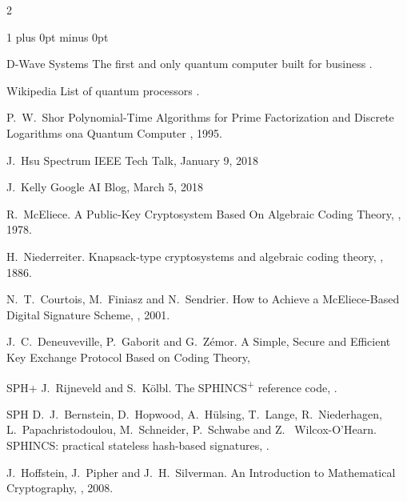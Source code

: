 \documentclass[a4paper,11pt]{article}
\begin{document}
\begin{otherlanguage}{english}
\begin{multicols}{2}
\begin{thebibliography}{1}
\itemsep=0cm plus 0pt minus 0pt

D-Wave Systems
\newblock The first and only quantum computer built for business
.

Wikipedia
\newblock List of quantum processors
.

P.~W.~Shor
\newblock Polynomial-Time Algorithms for Prime Factorization and Discrete Logarithms ona Quantum Computer
, 1995.

  J.~Hsu
  \newblock Spectrum IEEE Tech Talk, January 9, 2018

  J.~Kelly
  \newblock Google AI Blog, March 5, 2018

R.~McEliece.
\newblock A Public-Key Cryptosystem Based On Algebraic Coding Theory,
, 1978.

H.~Niederreiter.
\newblock Knapsack-type cryptosystems and algebraic coding theory,
, 1886.

N.~T.~Courtois, M.~Finiasz and N.~Sendrier.
\newblock How to Achieve a McEliece-Based Digital Signature Scheme,
, 2001.

J.~C.~Deneuveville, P.~Gaborit and G.~Zémor.
\newblock A Simple, Secure and Efficient Key Exchange Protocol Based on Coding Theory,

\bibitem
{SPH+}
J.~Rijneveld and S.~Kölbl.
\newblock The SPHINCS\textsuperscript{+} reference code,
.

\bibitem
{SPH}
D.~J.~Bernstein, D.~Hopwood, A.~Hülsing, T.~Lange, R.~Niederhagen, L.~Papachristodoulou, M.~Schneider, P.~Schwabe and Z.~ Wilcox-O’Hearn.
\newblock SPHINCS: practical stateless hash-based signatures,
.

J.~Hoffstein, J.~Pipher and J.~H.~Silverman.
\newblock An Introduction to Mathematical Cryptography,
, 2008.


\end{thebibliography}
\end{multicols}
\end{otherlanguage}
\end{document}
